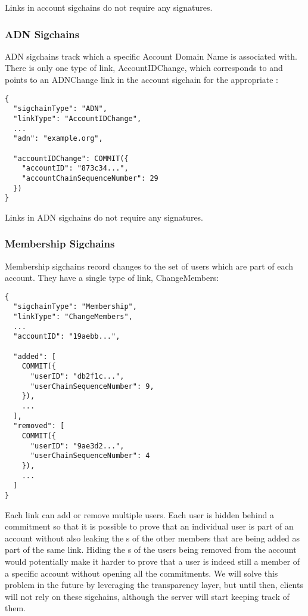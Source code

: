 Links in account sigchains do not require any signatures.

\subsubsection{ADN Sigchains}

ADN sigchains track which \accountID a specific Account Domain Name is associated with. There is
only one type of link, \textsf{AccountIDChange}, which corresponds to and points to an
\textsf{ADNChange} link in the account sigchain for the appropriate \accountID:

\begin{Verbatim}
{
  "sigchainType": "ADN",
  "linkType": "AccountIDChange",
  ...
  "adn": "example.org",

  "accountIDChange": COMMIT({
    "accountID": "873c34...",
    "accountChainSequenceNumber": 29
  })
}
\end{Verbatim}

Links in ADN sigchains do not require any signatures.

\subsubsection{Membership Sigchains}

Membership sigchains record changes to the set of users which are part of each account. They have a
single type of link, \textsf{ChangeMembers}:

\begin{Verbatim}
{
  "sigchainType": "Membership",
  "linkType": "ChangeMembers",
  ...
  "accountID": "19aebb...",

  "added": [
    COMMIT({
      "userID": "db2f1c...",
      "userChainSequenceNumber": 9,
    }),
    ...
  ],
  "removed": [
    COMMIT({
      "userID": "9ae3d2...",
      "userChainSequenceNumber": 4
    }),
    ...
  ]
}
\end{Verbatim}

Each link can add or remove multiple users. Each user is hidden behind a commitment so that it is
possible to prove that an individual user is part of an account without also leaking the {\userID}s
of the other members that are being added as part of the same link. Hiding the {\userID}s of the
users being removed from the account would potentially make it harder to prove that a user is indeed
still a member of a specific account without opening all the commitments. We will solve this problem
in the future by leveraging the transparency layer, but until then, clients will not rely on these
sigchains, although the server will start keeping track of them.

